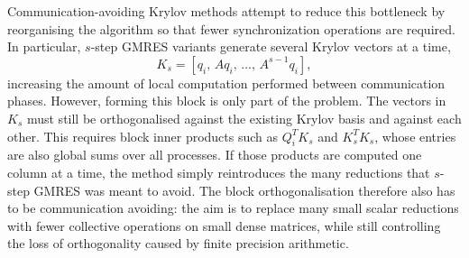 Communication-avoiding Krylov methods attempt to reduce this bottleneck by reorganising the algorithm so that fewer synchronization operations are required. In particular, \(s\)-step GMRES variants generate several Krylov vectors at a time,
\begin{equation}
    K_s
    =
    \left[
        q_i,\,
        Aq_i,\,
        \ldots,\,
        A^{s-1}q_i
    \right],
    \label{eq:s-step-krylov-block}
\end{equation}
increasing the amount of local computation performed between communication phases. However, forming this block is only part of the problem. The vectors in \(K_s\) must still be orthogonalised against the existing Krylov basis and against each other. This requires block inner products such as \(Q_i^T K_s\) and \(K_s^T K_s\), whose entries are also global sums over all processes. If those products are computed one column at a time, the method simply reintroduces the many reductions that \(s\)-step GMRES was meant to avoid. The block orthogonalisation therefore also has to be communication avoiding: the aim is to replace many small scalar reductions with fewer collective operations on small dense matrices, while still controlling the loss of orthogonality caused by finite precision arithmetic.

